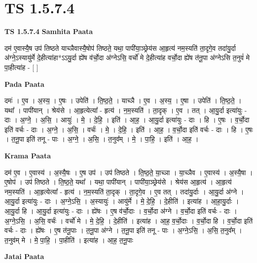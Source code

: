 \documentclass[17pt]{extarticle}
\begin{document}
\section{ TS 1.5.7.4 }

\textbf{TS 1.5.7.4 } \newline
\textbf{Samhita Paata} \newline

दम॑ ए॒वास्यै॒ष उप॑ तिष्ठते याच्ञैवास्यै॒षोप॑ तिष्ठते॒ यथा॒ पापी॑या॒ञ्छ्रेय॑स आ॒हृत्य॑ नम॒स्यति॑ ता॒दृगे॒व तदा॑यु॒र्दा अ॑ग्ने॒ऽस्यायु॑र्मे दे॒हीत्या॑हा*ऽऽयु॒र्दा ह्ये॑ष व॑र्चो॒दा अ॑ग्नेऽसि॒ वर्चो॑ मे दे॒हीत्या॑ह वर्चो॒दा ह्ये॑ष त॑नू॒पा अ॑ग्नेऽसि त॒नुवं॑ मे पा॒हीत्या॑ह - [ ] \newline

\textbf{Pada Paata} \newline

दमः॑ । ए॒व । अ॒स्य॒ । ए॒षः । उपेति॑ । ति॒ष्ठ॒ते॒ । याच्ञै । ए॒व । अ॒स्य॒ । ए॒षा । उपेति॑ । ति॒ष्ठ॒ते॒ । यथा᳚ । पापी॑यान् । श्रेय॑से । आ॒हृत्येत्या᳚ - हृत्य॑ । न॒म॒स्यति॑ । ता॒दृक् । ए॒व । तत् । आ॒यु॒र्दा इत्या॑युः - दाः । अ॒ग्ने॒ । अ॒सि॒ । आयुः॑ । मे॒ । दे॒हि॒ । इति॑ । आ॒ह॒ । आ॒यु॒र्दा इत्या॑युः - दाः । हि । ए॒षः । व॒र्चो॒दा इति॑ वर्चः - दाः । अ॒ग्ने॒ । अ॒सि॒ । वर्चः॑ । मे॒ । दे॒हि॒ । इति॑ । आ॒ह॒ । व॒र्चो॒दा इति॑ वर्चः - दाः । हि । ए॒षः । त॒नू॒पा इति॑ तनू - पाः । अ॒ग्ने॒ । अ॒सि॒ । त॒नुव᳚म् । मे॒ । पा॒हि॒ । इति॑ । आ॒ह॒ ।  \newline


\textbf{Krama Paata} \newline

दम॑ ए॒व । ए॒वास्य॑ । अ॒स्यै॒षः । ए॒ष उप॑ । उप॑ तिष्ठते । ति॒ष्ठ॒ते॒ या॒च्ञा । या॒च्ञैव । ए॒वास्य॑ । अ॒स्यै॒षा । ए॒षोप॑ । उप॑ तिष्ठते । ति॒ष्ठ॒ते॒ यथा᳚ । यथा॒ पापी॑यान् । पापी॑या॒ञ्छ्रेय॑से । श्रेय॑स आ॒हृत्य॑ । आ॒हृत्य॑ नम॒स्यति॑ । आ॒हृत्येत्या᳚ - हृत्य॑ । न॒म॒स्यति॑ ता॒दृक् । ता॒दृगे॒व । ए॒व तत् । तदा॑यु॒र्दाः । आ॒यु॒र्दा अ॑ग्ने । आ॒यु॒र्दा इत्या॑युः - दाः । अ॒ग्ने॒ऽसि॒ । अ॒स्यायुः॑ । आयु॑र्मे । मे॒ दे॒हि॒ । दे॒हीति॑ । इत्या॑ह । आ॒हा॒यु॒र्दाः । आ॒यु॒र्दा हि । आ॒यु॒र्दा इत्या॑युः - दाः । ह्ये॑षः । ए॒ष व॑र्चो॒दाः । व॒र्चो॒दा अ॑ग्ने । व॒र्चो॒दा इति॑ वर्चः - दाः । अ॒ग्ने॒ऽसि॒ । अ॒सि॒ वर्चः॑ । वर्चो॑ मे । मे॒ दे॒हि॒ । दे॒हीति॑ । इत्या॑ह । आ॒ह॒ व॒र्चो॒दाः । व॒र्चो॒दा हि । व॒र्चो॒दा इति॑ वर्चः - दाः । ह्ये॑षः । ए॒ष त॑नू॒पाः । त॒नू॒पा अ॑ग्ने । त॒नू॒पा इति॑ तनू - पाः । अ॒ग्ने॒ऽसि॒ । अ॒सि॒ त॒नुव᳚म् । त॒नुव॑म् मे । मे॒ पा॒हि॒ । पा॒हीति॑ । इत्या॑ह । आ॒ह॒ त॒नू॒पाः \newline

\textbf{Jatai Paata} \newline
\end{document}

